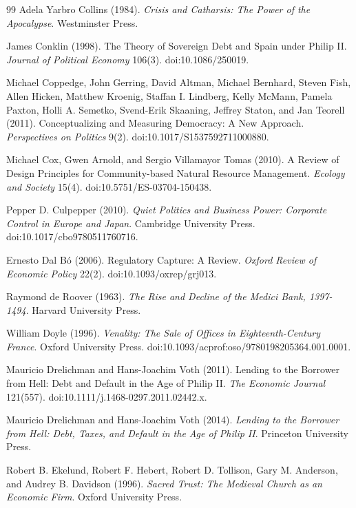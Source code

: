 \documentclass[11pt,letterpaper]{article}
\theoremstyle{definition}
\theoremstyle{remark}
\begin{document}
\begin{thebibliography}{99}
Adela Yarbro Collins (1984). \emph{Crisis and Catharsis: The Power of the Apocalypse}. Westminster Press.

James Conklin (1998). The Theory of Sovereign Debt and Spain under Philip II\@. \emph{Journal of Political Economy} 106(3). doi:10.1086/250019.

Michael Coppedge, John Gerring, David Altman, Michael Bernhard, Steven Fish, Allen Hicken, Matthew Kroenig, Staffan I. Lindberg, Kelly McMann, Pamela Paxton, Holli A. Semetko, Svend-Erik Skaaning, Jeffrey Staton, and Jan Teorell (2011). Conceptualizing and Measuring Democracy: A New Approach. \emph{Perspectives on Politics} 9(2). doi:10.1017/S1537592711000880.

Michael Cox, Gwen Arnold, and Sergio Villamayor Tomas (2010). A Review of Design Principles for Community-based Natural Resource Management. \emph{Ecology and Society} 15(4). doi:10.5751/ES-03704-150438.

Pepper D. Culpepper (2010). \emph{Quiet Politics and Business Power: Corporate Control in Europe and Japan}. Cambridge University Press. doi:10.1017/cbo9780511760716.

Ernesto Dal B\'o (2006). Regulatory Capture: A Review. \emph{Oxford Review of Economic Policy} 22(2). doi:10.1093/oxrep/grj013.

Raymond de Roover (1963). \emph{The Rise and Decline of the Medici Bank, 1397-1494}. Harvard University Press.

William Doyle (1996). \emph{Venality: The Sale of Offices in Eighteenth-Century France}. Oxford University Press. doi:10.1093/acprof:oso/9780198205364.001.0001.

Mauricio Drelichman and Hans-Joachim Voth (2011). Lending to the Borrower from Hell: Debt and Default in the Age of Philip II\@. \emph{The Economic Journal} 121(557). doi:10.1111/j.1468-0297.2011.02442.x.

Mauricio Drelichman and Hans-Joachim Voth (2014). \emph{Lending to the Borrower from Hell: Debt, Taxes, and Default in the Age of Philip II\@}. Princeton University Press.

Robert B. Ekelund, Robert F. Hebert, Robert D. Tollison, Gary M. Anderson, and Audrey B. Davidson (1996). \emph{Sacred Trust: The Medieval Church as an Economic Firm}. Oxford University Press.


\end{thebibliography}
\end{document}
